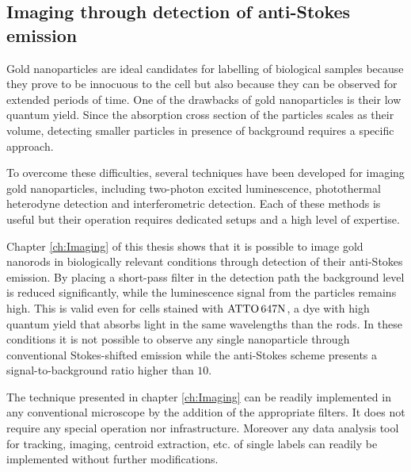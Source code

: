 \subsection{Imaging through detection of anti-Stokes emission}
Gold nanoparticles are ideal candidates for labelling of biological samples
because they prove to be innocuous to the cell\cite{Lewinski2008} but also
because they can be observed for extended periods of
time\cite{PEREZJUSTE2005,Mohamed2000}. One of the drawbacks of gold
nanoparticles is their low quantum yield. Since the absorption cross section of
the particles scales as their volume, detecting smaller particles in presence of
background requires a specific approach.

To overcome these difficulties, several techniques have been developed for
imaging gold nanoparticles, including two-photon excited
luminescence\cite{VandenBroek2013}, photothermal \mbox{heterodyne}
detection\cite{Berciaud2006} and interferometric detection\cite{Ignatovich2006}.
Each of these methods is useful but their operation requires dedicated setups
and a high level of expertise.

Chapter \ref{ch:Imaging} of this thesis shows that it is possible to image gold
nanorods in biologically relevant conditions through detection of their
anti-Stokes emission. By placing a short-pass filter in the detection path the
background level is reduced significantly, while the luminescence signal from
the particles remains high. This is valid even for cells stained with $\textrm{ATTO}\,647\textrm{N}$, a
dye with high quantum yield that absorbs light in the same wavelengths than the
rods. In these conditions it is not possible to observe any single nanoparticle
through conventional Stokes-shifted emission while the anti-Stokes scheme
presents a signal-to-background ratio higher than $10$.

The technique presented in chapter \ref{ch:Imaging} can be readily implemented
in any conventional microscope by the addition of the appropriate filters. It
does not require any special operation nor infrastructure. Moreover any data
analysis tool for tracking, imaging, centroid extraction, etc. of single labels
can readily be implemented without further modifications.

